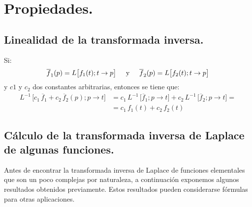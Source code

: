 \section{Propiedades.}

\subsection{Linealidad de la transformada inversa.}

Si:
\begin{align*}
\overline{f}_{1} (p) = L \big[f_{1} (t); t \to p\big] \hspace{0.5cm} \mbox{y} \hspace{0.5cm} \overline{f}_{2} (p) = L \big[f_{2} (t); t \to p\big]
\end{align*}
y $c{1}$ y $c_{2}$ dos constantes arbitrarias, entonces se tiene que:
\begin{align*}
L^{-1} \, \big[ c_{1} \, \overline{f}_{1} + c_{2} \, \overline{f}_{2} (p); p \to t\big] &= c_{1} \, L^{-1} \, \big[ \overline{f}_{1}; p \to t\big] + c_{2} \, L^{-1} \, \big[ \overline{f}_{2}; p \to t\big] = \\[0.5em]
&= c_{1} \, f_{1}(t) + c_{2} \, f_{2}(t)
\end{align*}

\subsection{Cálculo de la transformada inversa de Laplace de algunas funciones.}

Antes de encontrar la transformada inversa de Laplace de funciones elementales que son un poco complejas por naturaleza, a continuación exponemos algunos resultados obtenidos previamente. Estos resultados pueden considerarse fórmulas para otras aplicaciones.

